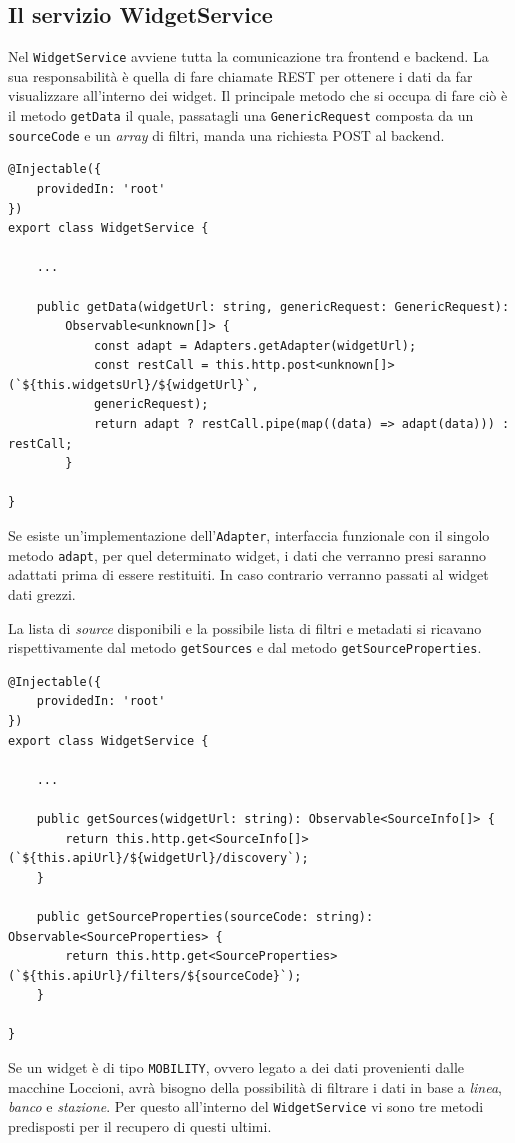 \subsection{Il servizio WidgetService}
Nel \verb|WidgetService| avviene tutta la comunicazione tra frontend e backend.
La sua responsabilità è quella di fare chiamate REST per ottenere i dati da far visualizzare all'interno dei widget. Il principale metodo che si occupa di fare ciò è il metodo \verb|getData| il quale, passatagli una \verb|GenericRequest| composta da un \verb|sourceCode| e un \textit{array} di filtri, manda una richiesta POST al backend.

\begin{lstlisting}[caption={Metodo getData all'interno della classe WidgetService}, style=javaScriptCode]
@Injectable({
    providedIn: 'root'
})
export class WidgetService {

    ...

    public getData(widgetUrl: string, genericRequest: GenericRequest): 
        Observable<unknown[]> {
            const adapt = Adapters.getAdapter(widgetUrl);
            const restCall = this.http.post<unknown[]>(`${this.widgetsUrl}/${widgetUrl}`, 
            genericRequest);
            return adapt ? restCall.pipe(map((data) => adapt(data))) : restCall;
        }

}

\end{lstlisting}
Se esiste un'implementazione dell'\verb|Adapter|, interfaccia funzionale con il singolo metodo \verb|adapt|, per quel determinato widget, i dati che verranno presi saranno adattati prima di essere restituiti. In caso contrario verranno passati al widget dati grezzi.

La lista di \textit{source} disponibili e la possibile lista di filtri e metadati si ricavano rispettivamente dal metodo \verb|getSources| e dal metodo \verb|getSourceProperties|.

\begin{lstlisting}[caption={Metodi getSources e getSourceProperties all'interno della classe WidgetService}, style=javaScriptCode]
@Injectable({
    providedIn: 'root'
})
export class WidgetService {

    ...
        
    public getSources(widgetUrl: string): Observable<SourceInfo[]> {
        return this.http.get<SourceInfo[]>(`${this.apiUrl}/${widgetUrl}/discovery`);
    }

    public getSourceProperties(sourceCode: string): Observable<SourceProperties> {
        return this.http.get<SourceProperties>(`${this.apiUrl}/filters/${sourceCode}`);
    }

}
\end{lstlisting}
Se un widget è di tipo \verb|MOBILITY|, ovvero legato a dei dati provenienti dalle macchine Loccioni, avrà bisogno della possibilità di filtrare i dati in base a \textit{linea}, \textit{banco} e \textit{stazione}. Per questo all'interno del \verb|WidgetService| vi sono tre metodi predisposti per il recupero di questi ultimi.

